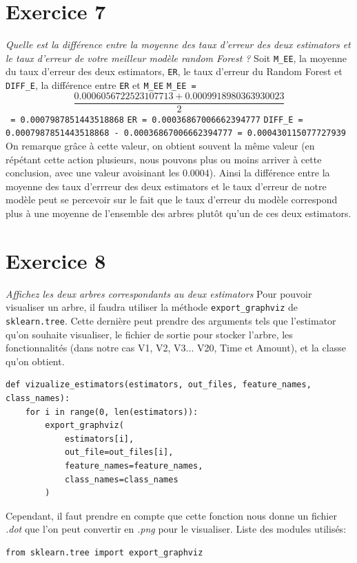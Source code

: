 \documentclass[a4paper, 12pt, oneside]{book}
\begin{document}
\section{Exercice 7}
\textit{Quelle est la différence entre la moyenne des taux d'erreur des deux estimators et le taux d'erreur de votre meilleur modèle random Forest ?}
\newline \newline
Soit \texttt{M\_EE}, la moyenne du taux d'erreur des deux estimators, \texttt{ER}, le taux d'erreur du Random Forest et \texttt{DIFF\_E}, la différence entre \texttt{ER} et \texttt{M\_EE}
\newline
\texttt{M\_EE = \begin{equation} \frac{0.0006056722523107713 + 0.0009918980363930023}{2} \end{equation} = 0.0007987851443518868}
\newline
\texttt{ER = 0.00036867006662394777}
\newline
\texttt{DIFF\_E = 0.0007987851443518868 - 0.00036867006662394777 = 0.000430115077727939}
\newline \newline
On remarque grâce à cette valeur, on obtient souvent la même valeur (en répétant cette action plusieurs, nous pouvons plus ou moins arriver à cette conclusion, avec une valeur avoisinant les 0.0004). Ainsi la différence entre la moyenne des taux d'errreur des deux estimators et le taux d'erreur de notre modèle peut se percevoir sur le fait que le taux d'erreur du modèle correspond plus à une moyenne de l'ensemble des arbres plutôt qu'un de ces deux estimators.

 

\section{Exercice 8}
\textit{Affichez les deux arbres correspondants au deux estimators}
\newline \newline
Pour pouvoir visualiser un arbre, il faudra utiliser la méthode \texttt{export\_graphviz} de \texttt{sklearn.tree}. Cette dernière peut prendre des arguments tels que l'estimator qu'on souhaite visualiser, le fichier de sortie pour stocker l'arbre, les fonctionnalités (dans notre cas V1, V2, V3... V20, Time et Amount), et la classe qu'on obtient.
\begin{verbatim}
def vizualize_estimators(estimators, out_files, feature_names, class_names):
    for i in range(0, len(estimators)):
        export_graphviz(
            estimators[i],
            out_file=out_files[i],
            feature_names=feature_names,
            class_names=class_names
        )
\end{verbatim}
Cependant, il faut prendre en compte que cette fonction nous donne un fichier \textit{.dot} que l'on peut convertir en \textit{.png} pour le visualiser.
\newline \newline
Liste des modules utilisés:
\begin{verbatim}
from sklearn.tree import export_graphviz
\end{verbatim}
\end{document}

